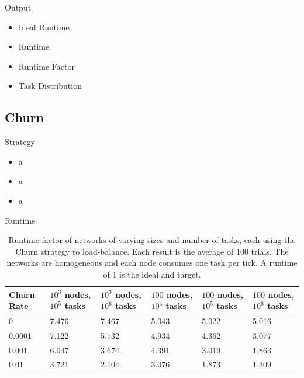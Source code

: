 \documentclass[11pt]{beamer}
\begin{document}
\begin{frame}{Output}
	\begin{itemize}
		
		\item Ideal Runtime
		\item Runtime
		\item Runtime Factor
		\item Task Distribution
	\end{itemize}
\end{frame}


\subsection{Churn}


\begin{frame}{Strategy}
	\begin{itemize}
		
		\item a
		\item a
		\item a
	\end{itemize}
\end{frame}

\begin{frame}{Runtime}
	\begin{table}[h]
		\tiny
		\centering
		\caption[Churn Runtimes in a homogenious network]{Runtime factor of networks of varying sizes and number of tasks, each using the Churn strategy to load-balance.  Each result is the average of 100 trials. The networks are homogeneous and each node consumes one task per tick.  A runtime of 1 is the ideal and target.}
		\begin{tabular}{|p{1cm} || p{1cm} | p{1cm} | p{1cm} | p{1cm} | p{1cm} |}
			\hline
			Churn Rate & $ 10^{3}$ nodes, $ 10^{5}$ tasks & $ 10^{3}$ nodes, $ 10^{6}$ tasks & $ 100$ nodes, $ 10^{4}$ tasks & $ 100$ nodes, $ 10^{5}$ tasks &$ 100$ nodes, $ 10^{6}$ tasks \\ \hline
			0      & 7.476   &  7.467 &  5.043& 5.022 &5.016 \\\hline
			0.0001 & 7.122   &  5.732 &  4.934& 4.362&3.077 \\\hline
			0.001  & 6.047   &  3.674 &  4.391& 3.019  &1.863\\\hline
			0.01  &  3.721   &  2.104 &  3.076& 1.873 &1.309\\\hline
			
		\end{tabular}
		\label{tab:ChurnRuntimesHomogenious}
	\end{table}
\end{frame}
\end{document}
